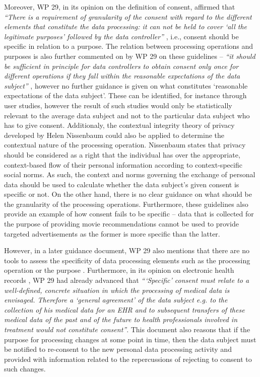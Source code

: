 Moreover, WP 29, in its opinion on the definition of consent, affirmed that \textit{``There is a requirement of granularity of the consent with regard to the different elements that constitute the data processing: it can not be held to cover `all the legitimate purposes' followed by the data controller''} \citep{article_29_data_protection_working_party_opinion_2011}, i.e., consent should be specific in relation to a purpose.
The relation between processing operations and purposes is also further commented on by WP 29 on these guidelines -- \textit{``it should be sufficient in principle for data controllers to obtain consent only once for different operations if they fall within the reasonable expectations of the data subject''} \citep{article_29_data_protection_working_party_opinion_2011}, however no further guidance is given on what constitutes `reasonable expectations of the data subject'.
These can be identified, for instance through user studies, however the result of such studies would only be statistically relevant to the average data subject and not to the particular data subject who has to give consent.
Additionaly, the contextual integrity theory of privacy developed by Helen Nissenbaum \citep{nissenbaum_privacy_2004} could also be applied to determine the contextual nature of the processing operation.
Nissenbaum states that privacy should be considered as a right that the individual has over the appropriate, context-based flow of their personal information according to context-specific social norms.
As such, the context and norms governing the exchange of personal data should be used to calculate whether the data subject's given consent is specific or not.
On the other hand, there is no clear guidance on what should be the granularity of the processing operations.
Furthermore, these guidelines also provide an example of how consent fails to be specific -- data that is collected for the purpose of providing movie recommendations cannot be used to provide targeted advertisements as the former is more specific than the latter.

However, in a later guidance document, WP 29 also mentions that there are no tools to assess the specificity of data processing elements such as the processing operation or the purpose
\citep{article_29_data_protection_working_party_article_2016}.
Furthermore, in its opinion on electronic health records \citep{article_29_data_protection_working_party_working_2007}, WP 29 had already advanced that \textit{```Specific' consent must relate to a well-defined, concrete situation in which the processing of medical data is envisaged. Therefore a `general agreement' of the data subject e.g. to the collection of his medical data for an EHR and to subsequent transfers of these medical data of the past and of the future to health professionals involved in treatment would not constitute consent''}.
This document also reasons that if the purpose for processing changes at some point in time, then the data subject must be notified to re-consent to the new personal data processing activity and provided with information related to the repercussions of rejecting to consent to such changes.

